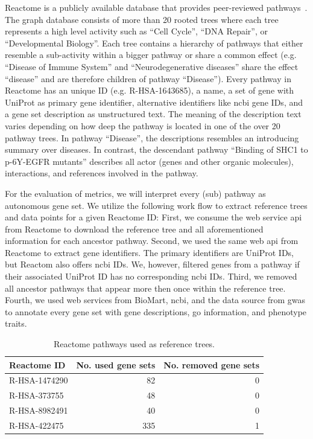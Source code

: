 \documentclass{thesisclass}
\begin{document}
Reactome is a publicly available database that provides peer-reviewed pathways~\cite{doi:10.1093/nar/gki072}. 
The graph database consists of more than 20 rooted trees where each tree represents a high level activity such as ``Cell Cycle'', ``DNA Repair'', or ``Developmental Biology''.
Each tree contains a hierarchy of pathways that either resemble a sub-activity within a bigger pathway or share a common effect (e.g. ``Disease of Immune System'' and ``Neurodegenerative diseases'' share the effect ``disease'' and are therefore children of pathway ``Disease''). 
Every pathway in Reactome has an unique ID (e.g. R-HSA-1643685), a name, a set of gene with UniProt as primary gene identifier, alternative identifiers like \acrshort{ncbi} gene IDs, and a gene set description as unstructured text. 
The meaning of the description text varies depending on how deep the pathway is located in one of the over 20 pathway trees. In pathway ``Disease'', the descriptions resembles an introducing summary over diseases. In contrast, the descendant pathway ``Binding of SHC1 to p-6Y-EGFR mutants'' describes all actor (genes and other organic molecules), interactions, and references involved in the pathway.

For the evaluation of metrics, we will interpret every (sub) pathway as autonomous gene set. We utilize the following work flow to extract reference trees and data points for a given Reactome ID: 
First, we consume the web service \acrshort{api} from Reactome to download the reference tree and all aforementioned information for each ancestor pathway.
Second, we used the same web \acrshort{api} from Reactome to extract gene identifiers. The primary identifiers are UniProt IDs, but Reactom also offers \acrshort{ncbi} IDs. 
We, however, filtered genes from a pathway if their associated UniProt ID has no corresponding \acrfull{ncbi} IDs.
Third, we removed all ancestor pathways that appear more then once within the reference tree. 
Fourth, we used web services from BioMart, \acrshort{ncbi}, and the data source from \acrfull{gwas} to annotate every gene set with gene descriptions, \acrshort{go} information, and phenotype traits.

\begin{table}[!h]
	\centering
	\begin{tabular}{l|r|r}
		Reactome ID & No. used gene sets & No. removed gene sets \\
		\hline
		R-HSA-1474290 & 82 & 0 \\
		R-HSA-373755 & 48 & 0 \\
		R-HSA-8982491 & 40 & 0 \\
		R-HSA-422475 & 335 & 1 \\
	\end{tabular}
	\caption{Reactome pathways used as reference trees.}
	\label{fig:reactome_trees}
\end{table}
\end{document}
